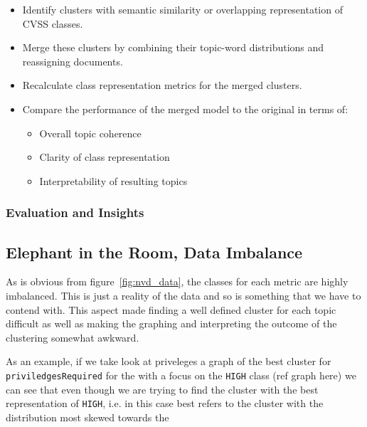 \documentclass[12pt]{article}
\begin{document}
\begin{itemize}

	\item Identify clusters with semantic similarity or overlapping representation of CVSS classes.

	\item Merge these clusters by combining their topic-word distributions and reassigning documents.

	\item Recalculate class representation metrics for the merged clusters.

	\item Compare the performance of the merged model to the original in terms of:

	      \begin{itemize}

		      \item Overall topic coherence

		      \item Clarity of class representation

		      \item Interpretability of resulting topics

	      \end{itemize}

\end{itemize}

\subsubsection{Evaluation and Insights}

\subsection{Elephant in the Room, Data Imbalance}

As is obvious from figure~\ref{fig:nvd_data}, the classes for each metric are highly imbalanced.
This is just a reality of the data and so is something that we have to contend with. This aspect
made finding a well defined cluster for each topic difficult as well as making the graphing and
interpreting the outcome of the clustering somewhat awkward.

As an example, if we take look at priveleges a graph of the best cluster for
\texttt{priviledgesRequired} for the with a focus on the \texttt{HIGH} class (ref graph here) we can see
that even though we are trying to find the cluster with the best representation of \texttt{HIGH},
i.e. in this case best refers to the cluster with the distribution most skewed towards the
\end{document}

